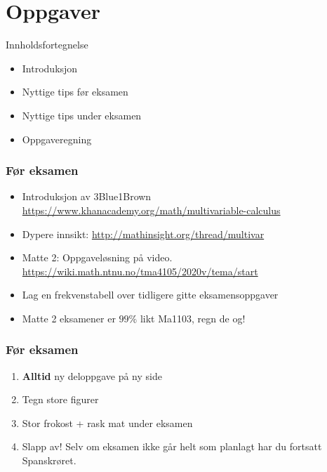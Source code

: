 \begin{frame}
    \titlepage
\end{frame}

\section{Oppgaver}

\begin{frame}{Innholdsfortegnelse}

\begin{itemize}
    \item Introduksjon
    \item Nyttige tips før eksamen
    \item Nyttige tips under eksamen
    \item Oppgaveregning
\end{itemize}

\end{frame}

\begin{frame}
    \frametitle{Før eksamen}
    \begin{itemize}
        \item Introduksjon av 3Blue1Brown
          \url{https://www.khanacademy.org/math/multivariable-calculus}
        \item Dypere innsikt: \url{http://mathinsight.org/thread/multivar}
        \item Matte 2: Oppgaveløsning på video.
          \url{https://wiki.math.ntnu.no/tma4105/2020v/tema/start}
        \item Lag en frekvenstabell over tidligere gitte eksamensoppgaver
        \item Matte 2 eksamener er $99\%$ likt Ma1103, regn de og!
    \end{itemize}
\end{frame}

\begin{frame}
  \frametitle{Før eksamen}
  \begin{enumerate}
    \item \textbf{Alltid} ny deloppgave på ny side
    \item Tegn store figurer
    \item Stor frokost + rask mat under eksamen
    \item Slapp av! Selv om eksamen ikke går helt som planlagt har du fortsatt
      Spanskrøret.
  \end{enumerate}
\end{frame}


